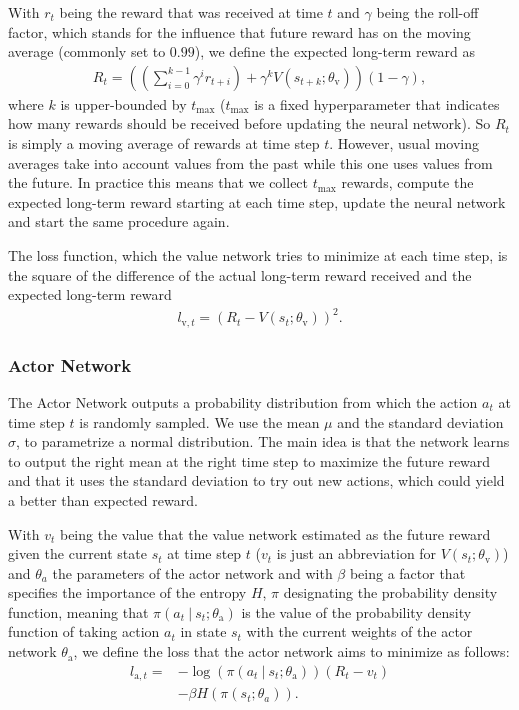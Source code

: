 \documentclass[sigconf]{acmart}
\newcommand\note[2]{{\color{#1}#2}}
\newcommand\todo[1]{{\note{red}{TODO: #1}}}
\newcommand\givenbase[1][]{\:#1\lvert\:}
\let\given\givenbase
\begin{document}
With $r_t$ being the reward that was received at time $t$ and $\gamma$ being the roll-off factor, which stands for the influence that future reward has on the moving average (commonly set to $0.99$), we define the expected long-term reward as 
\begin{align*}
R_t = \left(\left(\sum_{i=0}^{k-1} \gamma^ir_{t+i}\right) + \gamma^k V(s_{t+k}; \theta_\text{v})\right)\left( 1-\gamma \right),
\end{align*}
where $k$ is upper-bounded by $t_\text{max}$ ($t_\text{max}$ is a fixed hyperparameter that indicates how many rewards should be received before updating the neural network). So $R_t$ is simply a moving average of rewards at time step $t$. However, usual moving averages take into account values from the past while this one uses values from the future. In practice this means that we collect $t_\text{max}$ rewards, compute the expected long-term reward starting at each time step, update the neural network and start the same procedure again. 


The loss function, which the value network tries to minimize at each time step, is the square of the difference of the actual long-term reward received and the expected long-term reward
\begin{align*}
l_{\text{v},t} = \left(R_t - V(s_t; \theta_\text{v})\right)^2.
\end{align*}

\subsubsection{Actor Network}
\label{subsubsec:genericactor}

The Actor Network outputs a probability distribution from which the action $a_t$ at time step $t$ is randomly sampled. We use the mean $\mu$ and the standard deviation $\sigma$, to parametrize a normal distribution. The main idea is that the network learns to output the right mean at the right time step to maximize the future reward and that it uses the standard deviation to try out new actions, which could yield a better than expected reward. 

With $v_t$ being the value that the value network estimated as the future reward given the current state $s_t$ at time step $t$ ($v_t$ is just an abbreviation for $V(s_t; \theta_\text{v})$) and $\theta_a$ the parameters of the actor network and with $\beta$ being a factor that specifies the importance of the entropy $H$, $\pi$ designating the probability density function, meaning that $\pi\left( a_t \given s_t; \theta_\text{a} \right)$ is the value of the probability density function of taking action $a_t$ in state $s_t$ with the current weights of the actor network $\theta_\text{a}$, we define the loss that the actor network aims to minimize as follows:
\begin{align*}
l_{\text{a},t} =& -\log \left( \pi\left( a_t \given s_t; \theta_\text{a} \right)\right)\left( R_t - v_t \right)\\ 
&- \beta H\left( \pi\left( s_t; \theta_a \right)\right).
\end{align*}
\end{document}
